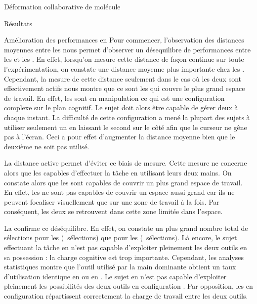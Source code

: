 \documentclass[myfrancais]{mythesis}
\begin{document}
\begin{mychapter}{Déformation collaborative de molécule}
\begin{mysection}{Résultats}
\begin{mysubsection}{Amélioration des performances en }
				Pour commencer, l'observation des distances moyennes entre les  nous permet d'observer un désequilibre de performances entre  les  et les  .
				En effet, lorsqu'on mesure cette distance de façon continue sur toute l'expérimentation, on constate une distance moyenne plus importante chez les .
				Cependant, la mesure de cette distance seulement dans le cas où les deux  sont effectivement actifs nous montre que ce sont les  qui couvre le plus grand espace de travail.
				En effet, les  sont en manipulation  ce qui est une configuration complexe sur le plan cognitif.
				Le sujet doit alors être capable de gérer deux  à chaque instant.
				La difficulté de cette configuration a mené la plupart des sujets à utiliser seulement un  en laissant le second sur le côté afin que le curseur ne gêne pas à l'écran.
				Ceci a pour effet d'augmenter la distance moyenne bien que le deuxième  ne soit pas utilisé.

				La distance active permet d'éviter ce biais de mesure.
				Cette mesure ne concerne alors que les  capables d'effectuer la tâche en utilisant leurs deux mains.
				On constate alors que les  sont capables de couvrir un plus grand espace de travail.
				En effet, les  ne sont pas capables de couvrir un espace aussi grand car ils ne peuvent focaliser visuellement que sur une zone de travail à la fois.
				Par conséquent, les deux  se retrouvent dans cette zone limitée dans l'espace.

				La  confirme ce déséquilibre.
				En effet, on constate un plus grand nombre total de sélections pour les  (~sélections) que pour les  (~sélections).
				Là encore, le sujet effectuant la tâche en  n'est pas capable d'exploiter pleinement les deux outils en sa possession : la charge cognitive est trop importante.
				Cependant, les analyses statistiques montre que l'outil utilisé par la main dominante obtient un taux d'utilisation identique en  ou en .
				Le sujet en  n'est pas capable d'exploiter pleinement les possibilités des deux outils en configuration .
				Par opposition, les  en configuration  répartissent correctement la charge de travail entre les deux outils.


\end{mysubsection}
\end{mysection}
\end{mychapter}
\end{document}
